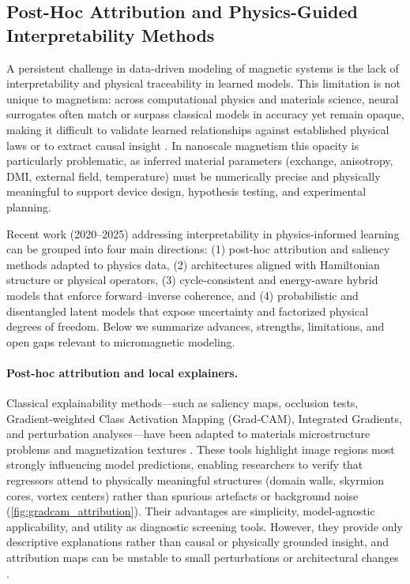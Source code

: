 \documentclass[letterpaper, 12, one column]{article}
\begin{document}
\subsection{Post-Hoc Attribution and Physics-Guided Interpretability Methods}\label{sec:state_art_interp}

A persistent challenge in data-driven modeling of magnetic systems is the lack of interpretability and physical traceability in learned models. This limitation is not unique to magnetism: across computational physics and materials science, neural surrogates often match or surpass classical models in accuracy yet remain opaque, making it difficult to validate learned relationships against established physical laws or to extract causal insight \cite{Oviedo2022}. In nanoscale magnetism this opacity is particularly problematic, as inferred material parameters (exchange, anisotropy, DMI, external field, temperature) must be numerically precise and physically meaningful to support device design, hypothesis testing, and experimental planning.

Recent work (2020–2025) addressing interpretability in physics-informed learning can be grouped into four main directions: (1) post-hoc attribution and saliency methods adapted to physics data, (2) architectures aligned with Hamiltonian structure or physical operators, (3) cycle-consistent and energy-aware hybrid models that enforce forward--inverse coherence, and (4) probabilistic and disentangled latent models that expose uncertainty and factorized physical degrees of freedom. Below we summarize advances, strengths, limitations, and open gaps relevant to micromagnetic modeling.

\paragraph{Post-hoc attribution and local explainers.}
Classical explainability methods---such as saliency maps, occlusion tests, Gradient-weighted Class Activation Mapping (Grad-CAM), Integrated Gradients, and perturbation analyses---have been adapted to materials microstructure problems and magnetization textures \cite{Oviedo2022}. These tools highlight image regions most strongly influencing model predictions, enabling researchers to verify that regressors attend to physically meaningful structures (domain walls, skyrmion cores, vortex centers) rather than spurious artefacts or background noise (\cref{fig:gradcam_attribution}). Their advantages are simplicity, model-agnostic applicability, and utility as diagnostic screening tools. However, they provide only descriptive explanations rather than causal or physically grounded insight, and attribution maps can be unstable to small perturbations or architectural changes \cite{Talapatra2022Understanding}.
\end{document}
